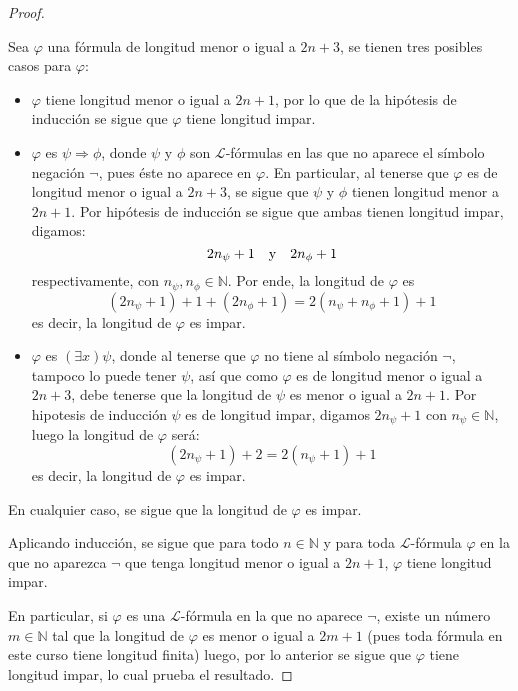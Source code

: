 \documentclass[12pt]{article}
\newcounter{it}
\theoremstyle{largebreak}
\begin{document}
\begin{proof}
\begin{itemize}
            Sea $\varphi$ una fórmula de longitud menor o igual a $2n+3$, se tienen tres posibles casos para $\varphi$:
            \begin{itemize}
                \item $\varphi$ tiene longitud menor o igual a $2n+1$, por lo que de la hipótesis de inducción se sigue que $\varphi$ tiene longitud impar.
                \item $\varphi$ es $\psi\Rightarrow\phi$, donde $\psi$ y $\phi$ son $\mathcal{L}$-fórmulas en las que no aparece el símbolo negación $\neg$, pues éste no aparece en $\varphi$. En particular, al tenerse que $\varphi$ es de longitud menor o igual a $2n+3$, se sigue que $\psi$ y $\phi$ tienen longitud menor a $2n+1$. Por hipótesis de inducción se sigue que ambas tienen longitud impar, digamos:
                \begin{equation*}
                    2n_\psi+1\quad\textup{y}\quad 2n_\phi+1
                \end{equation*}
                respectivamente, con $n_\psi,n_\phi\in\mathbb{N}$. Por ende, la longitud de $\varphi$ es
                \begin{equation*}
                    (2n_\psi+1)+1+(2n_\phi+1)=2(n_\psi+n_\phi+1)+1
                \end{equation*}
                es decir, la longitud de $\varphi$ es impar.
                \item $\varphi$ es $(\exists x)\psi$, donde al tenerse que $\varphi$ no tiene al símbolo negación $\neg$, tampoco lo puede tener $\psi$, así que como $\varphi$ es de longitud menor o igual a $2n+3$, debe tenerse que la longitud de $\psi$ es menor o igual a $2n+1$. Por hipotesis de inducción $\psi$ es de longitud impar, digamos $2n_\psi+1$ con $n_\psi\in\mathbb{N}$, luego la longitud de $\varphi$ será:
                \begin{equation*}
                    (2n_\psi+1)+2=2(n_\psi+1)+1
                \end{equation*}
                es decir, la longitud de $\varphi$ es impar.
            \end{itemize}
            En cualquier caso, se sigue que la longitud de $\varphi$ es impar.
        \end{itemize}
        Aplicando inducción, se sigue que para todo $n\in\mathbb{N}$ y para toda $\mathcal{L}$-fórmula $\varphi$ en la que no aparezca $\neg$ que tenga longitud menor o igual a $2n+1$, $\varphi$ tiene longitud impar.
        
        En particular, si $\varphi$ es una $\mathcal{L}$-fórmula en la que no aparece $\neg$, existe un número $m\in\mathbb{N}$ tal que la longitud de $\varphi$ es menor o igual a $2m+1$ (pues toda fórmula en este curso tiene longitud finita) luego, por lo anterior se sigue que $\varphi$ tiene longitud impar, lo cual prueba el resultado.
    \end{proof}
    
\end{document}
